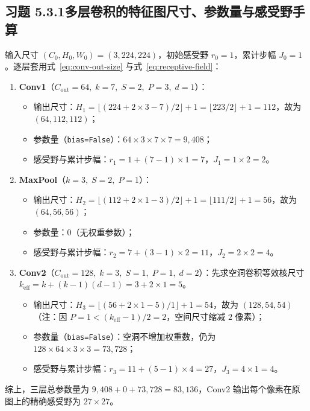\subsection*{习题 5.3.1\quad 多层卷积的特征图尺寸、参数量与感受野手算}
输入尺寸 $(C_0, H_0, W_0) = (3, 224, 224)$，初始感受野 $r_0 = 1$，累计步幅 $J_0 = 1$。逐层套用式~\eqref{eq:conv-out-size} 与式~\eqref{eq:receptive-field}：
\begin{enumerate}[label=(\arabic*), leftmargin=1.8em]
  \item \textbf{Conv1}（$C_{\text{out}}=64,\; k=7,\; S=2,\; P=3,\; d=1$）：
  \begin{itemize}
    \item 输出尺寸：$H_1 = \lfloor(224 + 2\times 3 - 7)/2\rfloor + 1 = \lfloor 223/2 \rfloor + 1 = 112$，故为 $(64, 112, 112)$；
    \item 参数量（\texttt{bias=False}）：$64 \times 3 \times 7 \times 7 = 9{,}408$；
    \item 感受野与累计步幅：$r_1 = 1 + (7 - 1)\times 1 = 7$，$J_1 = 1 \times 2 = 2$。
  \end{itemize}

  \item \textbf{MaxPool}（$k=3,\; S=2,\; P=1$）：
  \begin{itemize}
    \item 输出尺寸：$H_2 = \lfloor(112 + 2\times 1 - 3)/2\rfloor + 1 = \lfloor 111/2 \rfloor + 1 = 56$，故为 $(64, 56, 56)$；
    \item 参数量：$0$（无权重参数）；
    \item 感受野与累计步幅：$r_2 = 7 + (3 - 1)\times 2 = 11$，$J_2 = 2 \times 2 = 4$。
  \end{itemize}

  \item \textbf{Conv2}（$C_{\text{out}}=128,\; k=3,\; S=1,\; P=1,\; d=2$）：先求空洞卷积等效核尺寸 $k_{\text{eff}} = k + (k-1)(d-1) = 3 + 2\times 1 = 5$。
  \begin{itemize}
    \item 输出尺寸：$H_3 = \lfloor(56 + 2\times 1 - 5)/1\rfloor + 1 = 54$，故为 $(128, 54, 54)$（注：因 $P=1 < (k_{\text{eff}}-1)/2 = 2$，空间尺寸缩减 $2$ 像素）；
    \item 参数量（\texttt{bias=False}）：空洞不增加权重数，仍为 $128 \times 64 \times 3 \times 3 = 73{,}728$；
    \item 感受野与累计步幅：$r_3 = 11 + (5 - 1)\times 4 = 27$，$J_3 = 4 \times 1 = 4$。
  \end{itemize}
\end{enumerate}
综上，三层总参数量为 $9{,}408 + 0 + 73{,}728 = 83{,}136$，Conv2 输出每个像素在原图上的精确感受野为 $27 \times 27$。


